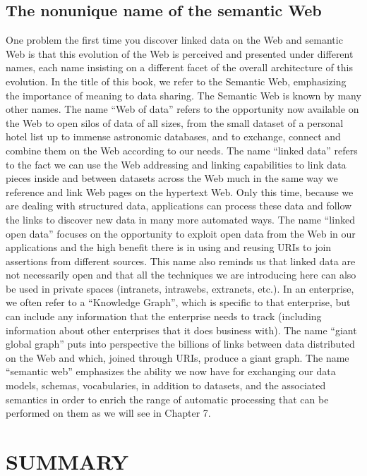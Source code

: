 \subsection{The nonunique name of the semantic Web}

One problem the first time you discover linked data on the Web and
semantic Web is that this evolution of the Web is perceived and
presented under different names, each name insisting on a different
facet of the overall architecture of this evolution. In the title of
this book, we refer to the Semantic Web, emphasizing the importance of
meaning to data sharing. The Semantic Web is known by many other names.
The name ``Web of data'' refers to the opportunity now available on the
Web to open silos of data of all sizes, from the small dataset of a
personal hotel list up to immense astronomic databases, and to exchange,
connect and combine them on the Web according to our needs. The name
``linked data'' refers to the fact we can use the Web addressing and
linking capabilities to link data pieces inside and between datasets
across the Web much in the same way we reference and link Web pages on
the hypertext Web. Only this time, because we are dealing with structured
data, applications can process these data and follow the links to
discover new data in many more automated ways. The name ``linked open
data'' focuses on the opportunity to exploit open data from the Web in
our applications and the high benefit there is in using and reusing URIs
to join assertions from different sources. This name also reminds us
that linked data are not necessarily open and that all the techniques we
are introducing here can also be used in private spaces (intranets,
intrawebs, extranets, etc.). In an enterprise, we often refer to a
``Knowledge Graph'', which is specific to that enterprise, but can
include any information that the enterprise needs to track (including
information about other enterprises that it does business with). The
name ``giant global graph'' puts into perspective the billions of links
between data distributed on the Web and which, joined through URIs,
produce a giant graph. The name ``semantic web'' emphasizes the ability
we now have for exchanging our data models, schemas, vocabularies, in
addition to datasets, and the associated semantics in order to enrich
the range of automatic processing that can be performed on them as we
will see in Chapter 7.

\section{SUMMARY}

